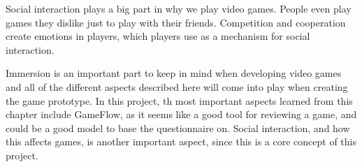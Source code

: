 Social interaction plays a big part in why we play video games. People even play games they dislike just to play with their friends. Competition and cooperation create emotions in players, which players use as a mechanism for social interaction.

Immersion is an important part to keep in mind when developing video games and all of the different aspects described here will come into play when creating the game prototype. In this project, th most important aspects learned from this chapter include GameFlow, as it seems like a good tool for reviewing a game, and could be a good model to base the questionnaire on. Social interaction, and how this affects games, is another important aspect, since this is a core concept of this project.

